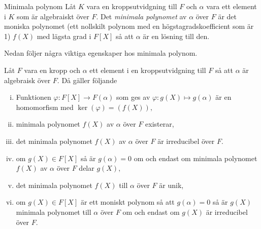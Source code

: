 \documentclass{article}
\theoremstyle{definition}
\begin{document}
\begin{mydef}{Minimala polynom}{}
  Låt $K$ vara en kroppsutvidgning till $F$ och $\alpha$ vara ett element i $K$ som är algebraiskt över $F$. Det \textit{minimala polynomet} av $\alpha$ över $F$
  är det moniska polynomet (ett nollskilt polynom med en högstagradskoefficient som är 1) $f(X)$ med lägsta grad i $F[X]$ så att $\alpha$ är en lösning till den. 
\end{mydef}

Nedan följer några viktiga egenskaper hos minimala polynom.
\hypertarget{minpol}{}
\begin{mytheo}{}{}
  Låt $F$ vara en kropp och $\alpha$ ett element i en kroppsutvidgning till $F$ så att $\alpha$ är algebraisk över $F$. Då gäller följande 
  \begin{enumerate}[(i)]
    \item Funktionen $\varphi: F[X] \rightarrow F(\alpha)$ som ges av $\varphi: g(X) \mapsto g(\alpha)$ är en homomorfism med $\ker(\varphi) = (f(X)),$
    \item minimala polynomet $f(X)$ av $\alpha$ över $F$ existerar,
    \item det minimala polynomet $f(X)$ av $\alpha$ över $F$ är irreducibel över $F$.
    \item om $g(X) \in F[X]$ så är $g(\alpha) = 0$ om och endast om minimala polynomet $f(X)$ av $\alpha$ över $F$ delar $g(X),$
    \item det minimala polynomet $f(X)$ till $\alpha$ över $F$ är unik, 
    \item om $g(X) \in F[X]$ är ett moniskt polynom så att $g(\alpha) = 0$ så är $g(X)$ minimala polynomet till $\alpha$ över $F$ om och endast 
    om $g(X)$ är irreducibel över $F$.
  \end{enumerate}
\end{mytheo}
\end{document}
